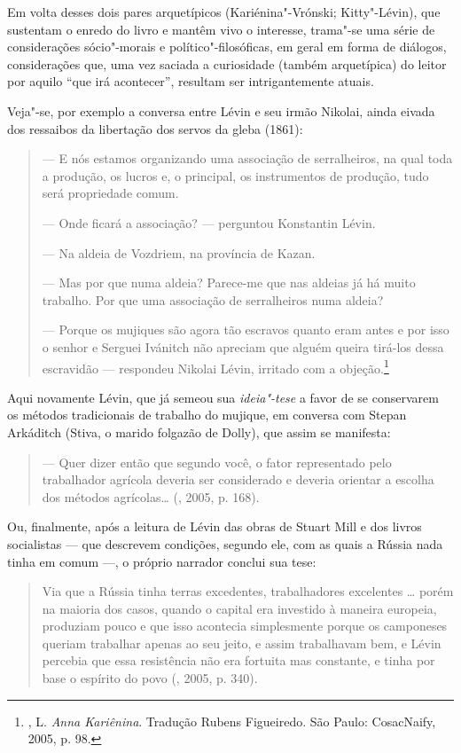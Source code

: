 Em volta desses dois pares arquetípicos (Kariénina"-Vrónski; Kitty"-Lévin), que sustentam o enredo do
livro e mantêm vivo o interesse, trama"-se uma série de considerações
sócio"-morais e político"-filosóficas, em geral em forma de diálogos, considerações que,
uma vez saciada a curiosidade (também arquetípica) do leitor por aquilo
``que irá acontecer'', resultam ser intrigantemente atuais.

Veja"-se, por exemplo a conversa entre Lévin e seu irmão Nikolai, ainda
eivada dos ressaibos da libertação dos servos da gleba (1861):

\begin{quotation}
--- E nós estamos organizando uma associação de serralheiros, na qual toda a produção, os
lucros e, o principal, os instrumentos de produção, tudo será propriedade comum.

--- Onde ficará a associação? --- perguntou Konstantin Lévin.

--- Na aldeia de Vozdriem, na província de Kazan.

--- Mas por que numa aldeia? Parece-me que nas aldeias
já há muito trabalho. Por que uma associação de serralheiros numa aldeia?

--- Porque os mujiques são agora tão escravos quanto
eram antes e por isso o senhor e Serguei Ivánitch não apreciam
que alguém queira tirá-los dessa escravidão --- respondeu Nikolai
Lévin, irritado com a objeção.\footnote{, L. \emph{Anna Kariênina}. Tradução Rubens Figueiredo. São Paulo: CosacNaify, 2005, p. 98.}
\end{quotation}

Aqui novamente Lévin, que já semeou sua \emph{ideia"-tese} a
favor de se conservarem os métodos tradicionais de trabalho do
mujique, em conversa com Stepan Arkáditch (Stiva, o marido folgazão de
Dolly), que assim se manifesta:

\begin{quotation}
--- Quer dizer então que segundo você, o fator representado pelo
trabalhador agrícola deveria ser considerado e deveria orientar a
escolha dos métodos agrícolas\ldots{} (, 2005, p. 168).
\end{quotation}

Ou, finalmente, após a leitura de Lévin das obras de Stuart Mill e dos livros
socialistas --- que descrevem condições, segundo ele, com as
quais a Rússia nada tinha em comum ---, o próprio
narrador conclui sua tese:

\begin{quotation}
Via que a Rússia tinha terras excedentes, trabalhadores excelentes \ldots{}
porém na maioria dos casos, quando o capital era investido à maneira
europeia, produziam pouco e que isso
acontecia simplesmente porque os camponeses queriam trabalhar apenas ao
seu jeito, e assim trabalhavam bem, e Lévin percebia que essa
resistência não era fortuita mas constante, e tinha por base o espírito
do povo (, 2005, p. 340).
\end{quotation}

